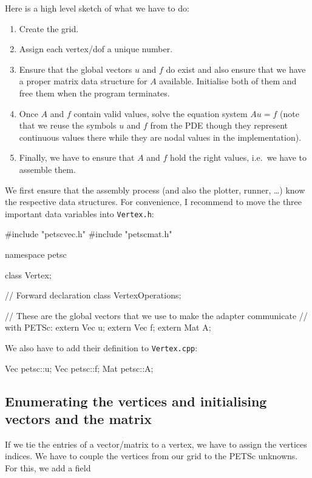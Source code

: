 Here is a high level sketch of what we have to do:
\begin{enumerate}
  \item Create the grid.
  \item Assign each vertex/dof a unique number.
  \item Ensure that the global vectors $u$ and $f$ do exist and also ensure that
  we have a proper matrix data structure for $A$ available. Initialise both of
  them and free them when the program terminates.
  \item Once $A$ and $f$ contain valid values, solve the equation system $Au=f$
  (note that we reuse the symbols $u$ and $f$ from the PDE though they
  represent continuous values there while they are nodal values in the
  implementation).
  \item Finally, we have to ensure that $A$ and $f$ hold the right values,
  i.e.~we have to assemble them.
\end{enumerate}

\noindent
We first ensure that the assembly process (and also the plotter, runner, \ldots)
know the respective data structures.
For convenience, I recommend to move the three important data variables
into \texttt{Vertex.h}:

\begin{code}
#include "petscvec.h"
#include "petscmat.h"


namespace petsc { 
  class Vertex;
      
  // Forward declaration
  class VertexOperations;

  // These are the global vectors that we use to make the adapter communicate
  // with PETSc:
  extern Vec  u;
  extern Vec  f;
  extern Mat  A;
}
\end{code}

\noindent
We also have to add their definition
to \texttt{Vertex.cpp}:

\begin{code}
Vec  petsc::u;
Vec  petsc::f;
Mat  petsc::A;
\end{code}


\subsection{Enumerating the vertices and initialising vectors and the matrix}

If we tie the entries of a vector/matrix to a vertex, we have to assign the
vertices indices.
We have to couple the vertices from our grid to the PETSc unknowns.
For this, we add a field     

